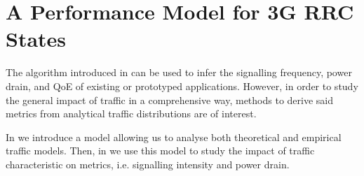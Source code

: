 \section{A Performance Model for 3G RRC States}\label{sec:network:performance_model}
The algorithm introduced in  can be used to infer the signalling frequency, power drain, and \gls{QoE} of existing or prototyped applications.
However, in order to study the general impact of traffic in a comprehensive way, methods to derive said metrics from analytical traffic distributions are of interest.

In  we introduce a model allowing us to
analyse both theoretical and empirical traffic models.
Then, in  we use this model to study the impact of traffic characteristic on metrics, i.e. signalling intensity and power drain.



